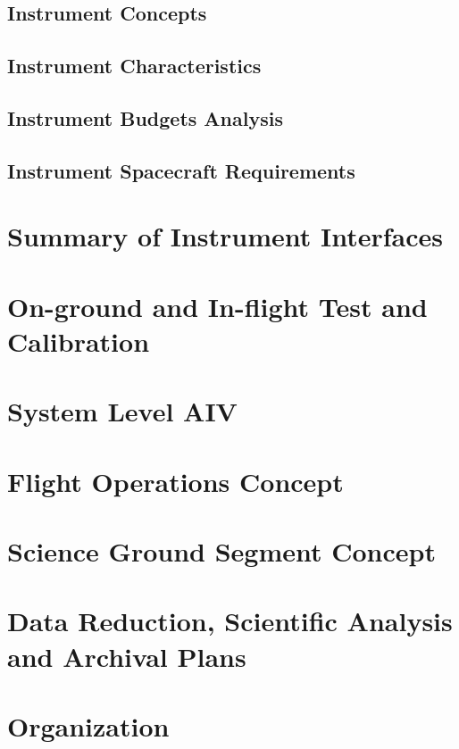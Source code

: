 \subsection{Instrument Concepts}
\subsection{Instrument Characteristics}
\subsection{Instrument Budgets Analysis}
\subsection{Instrument Spacecraft Requirements}
%
\section{Summary of Instrument Interfaces}
%
\section{On-ground and In-flight Test and Calibration}
%
\section{System Level AIV}
%
\section{Flight Operations Concept}
%
\section{Science Ground Segment Concept}
%
\section{Data Reduction, Scientific Analysis and Archival Plans}
%
\section{Organization}

